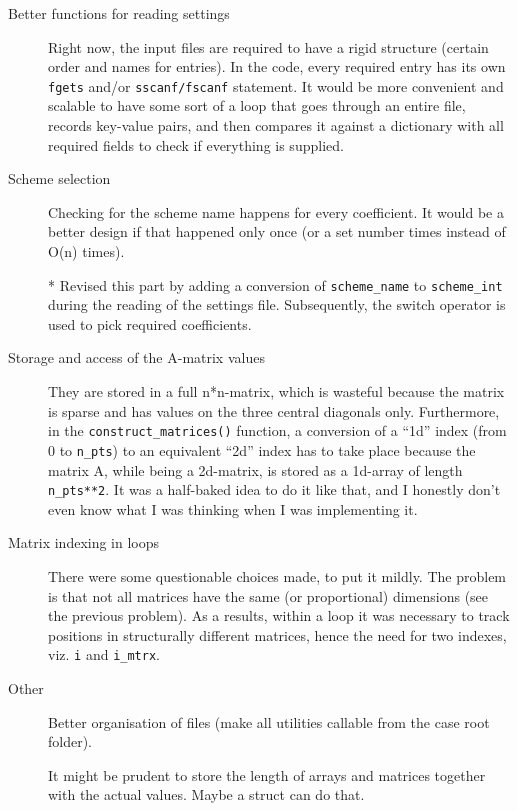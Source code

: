 \documentclass[12pt]{article}
\begin{document}
\begin{description}

\item[Better functions for reading settings] Right now, the input files are required to have a rigid structure (certain order and names for entries). In the code, every required entry has its own \verb|fgets| and/or \verb|sscanf/fscanf| statement. It would be more convenient and scalable to have some sort of a loop that goes through an entire file, records key-value pairs, and then compares it against a dictionary with all required fields to check if everything is supplied.

\item[Scheme selection] Checking for the scheme name happens for every coefficient. It would be a better design if that happened only once (or a set number times instead of O(n) times).

* Revised this part by adding a conversion of \verb|scheme_name| to \verb|scheme_int| during the reading of the settings file. Subsequently, the switch operator is used to pick required coefficients.

\item[Storage and access of the A-matrix values] They are stored in a full n*n-matrix, which is wasteful because the matrix is sparse and has values on the three central diagonals only. Furthermore, in the \verb|construct_matrices()| function, a conversion of a ``1d'' index (from 0 to \verb|n_pts|) to an equivalent ``2d'' index has to take place because the matrix A, while being a 2d-matrix, is stored as a 1d-array of length \verb|n_pts**2|. It was a half-baked idea to do it like that, and I honestly don't even know what I was thinking when I was implementing it.

\item[Matrix indexing in loops] There were some questionable choices made, to put it mildly. The problem is that not all matrices have the same (or proportional) dimensions (see the previous problem). As a results, within a loop it was necessary to track positions in structurally different matrices, hence the need for two indexes, viz. \verb|i| and \verb|i_mtrx|.

\item[Other] Better organisation of files (make all utilities callable from the case root folder).

It might be prudent to store the length of arrays and matrices together with the actual values. Maybe a struct can do that.

\end{description}
\end{document}
